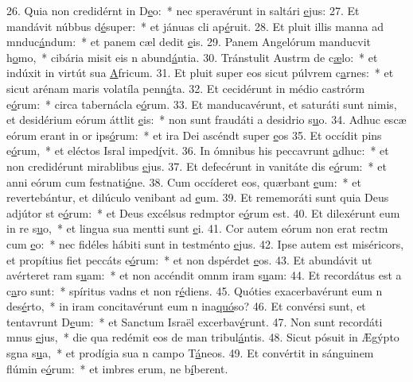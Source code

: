 26. Quia non credidérnt in D\uline{e}o:~* nec speravérunt in saltári \uline{e}jus:
27. Et mandávit núbbus d\uline{é}super:~* et jánuas cli ap\uline{é}ruit.
28. Et pluit illis manna ad mnduc\uline{á}ndum:~* et panem cæl dedit \uline{e}is.
29. Panem Angelórum manducvit h\uline{o}mo,~* cibária misit eis n abund\uline{á}ntia.
30. Tránstulit Austrm de c\uline{æ}lo:~* et indúxit in virtút sua \uline{A}fricum.
31. Et pluit super eos sicut púlvrem c\uline{a}rnes:~* et sicut arénam maris volatíla penn\uline{á}ta.
32. Et cecidérunt in médio castrórm e\uline{ó}rum:~* circa tabernácla e\uline{ó}rum.
33. Et manducavérunt, et saturáti sunt nimis, et desidérium eórum áttlit \uline{e}is:~* non sunt fraudáti a desidrio s\uline{u}o.
34. Adhuc escæ eórum erant in or ips\uline{ó}rum:~* et ira Dei ascéndt super \uline{e}os
35. Et occídit pins e\uline{ó}rum,~* et eléctos Isral imped\uline{í}vit.
36. In ómnibus his peccavrunt \uline{a}dhuc:~* et non credidérunt mirablibus \uline{e}jus.
37. Et defecérunt in vanitáte dis e\uline{ó}rum:~* et anni eórum cum festnati\uline{ó}ne.
38. Cum occíderet eos, quærbant \uline{e}um:~* et revertebántur, et dilúculo venibant ad \uline{e}um.
39. Et rememoráti sunt quia Deus adjútor st e\uline{ó}rum:~* et Deus excélsus redmptor e\uline{ó}rum est.
40. Et dilexérunt eum in re s\uline{u}o,~* et lingua sua mentti sunt \uline{e}i.
41. Cor autem eórum non erat rectm cum \uline{e}o:~* nec fidéles hábiti sunt in testménto \uline{e}jus.
42. Ipse autem est miséricors, et propítius fiet peccáts e\uline{ó}rum:~* et non dspérdet \uline{e}os.
43. Et abundávit ut avérteret ram s\uline{u}am:~* et non accéndit omnm iram s\uline{u}am:
44. Et recordátus est a c\uline{a}ro sunt:~* spíritus vadns et non r\uline{é}diens.
45. Quóties exacerbavérunt eum n des\uline{é}rto,~* in iram concitavérunt eum n ina\uline{quó}so?
46. Et convérsi sunt, et tentavrunt D\uline{e}um:~* et Sanctum Israël excerbav\uline{é}runt.
47. Non sunt recordáti mnus \uline{e}jus,~* die qua redémit eos de man tribul\uline{á}ntis.
48. Sicut pósuit in Ægýpto sgna s\uline{u}a,~* et prodígia sua n campo T\uline{á}neos.
49. Et convértit in sánguinem flúmin e\uline{ó}rum:~* et imbres erum, ne b\uline{í}berent.
